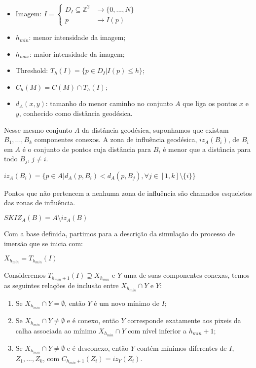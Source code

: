 \documentclass[a4paper,11pt]{report}
\begin{document}
  \begin{itemize}
    \item Imagem: $I=\begin{cases}D_I \subseteq \mathbb{Z}^2 & \rightarrow \{0,...,N\} \\ p & \rightarrow I(p)\end{cases}$
    \item $h_{min}$: menor intensidade da imagem;
    \item $h_{max}$: maior intensidade da imagem;
    \item Threshold: $T_h(I) = \{ p \in D_I | I(p) \leq h\}$;
    \item $C_h(M) = C(M) \cap T_h(I)$;
    \item $d_A(x,y)$: tamanho do menor caminho no conjunto $A$ que liga os pontos $x$ e $y$, conhecido como distância geodésica.
  \end{itemize}

  Nesse mesmo conjunto $A$ da distância geodésica, suponhamos que existam $B_1,...,B_k$ componentes conexos. A zona de influência geodésica, $iz_A(B_i)$, de $B_i$ em $A$ é o conjunto de pontos cuja distância para $B_i$ é menor que a distância para todo $B_j$, $j \neq i$.

  $iz_A(B_i) = \{ p \in A | d_A(p, B_i) < d_A(p, B_j), \forall j \in [1, k] \setminus \{i\}\}$

  Pontos que não pertencem a nenhuma zona de influência são chamados esqueletos das zonas de influência.

  $SKIZ_A(B) = A \setminus iz_A(B)$

  Com a base definida, partimos para a descrição da simulação do processo de imersão que se inicia com:

  $X_{h_{min}} = T_{h_{min}}(I)$

  Consideremos $T_{h_{min} + 1}(I) \supseteq X_{h_{min}}$ e $Y$ uma de suas componentes conexas, temos as seguintes relações de inclusão entre $X_{h_{min}} \cap Y$ e $Y$:

  \begin{enumerate}
    \item Se $X_{h_{min}} \cap Y = \emptyset$, então $Y$ é um novo mínimo de $I$;
    \item Se $X_{h_{min}} \cap Y \neq \emptyset$ e é conexo, então $Y$ corresponde exatamente aos pixeis da calha associada ao mínimo $X_{h_{min}} \cap Y$ com nível inferior a $h_{min} + 1$;
    \item Se $X_{h_{min}} \cap Y \neq \emptyset$ e é desconexo, então $Y$ contém mínimos diferentes de $I$, $Z_1,...,Z_k$, com $C_{h_{min} + 1}(Z_i) = iz_Y(Z_i)$.
  \end{enumerate}
\end{document}
